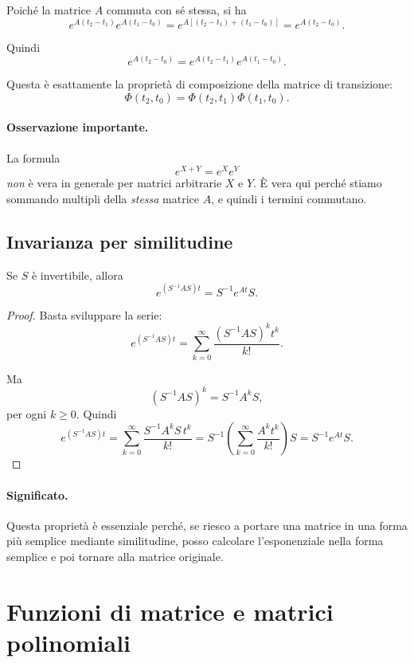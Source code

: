 Poiché la matrice $A$ commuta con sé stessa, si ha
\[
e^{A(t_2-t_1)}e^{A(t_1-t_0)}=e^{A[(t_2-t_1)+(t_1-t_0)]}=e^{A(t_2-t_0)}.
\]

Quindi
\begin{equation}
e^{A(t_2-t_0)}=e^{A(t_2-t_1)}e^{A(t_1-t_0)}.
\label{eq:L5_exp_composition}
\end{equation}

Questa è esattamente la proprietà di composizione della matrice di transizione:
\[
\Phi(t_2,t_0)=\Phi(t_2,t_1)\Phi(t_1,t_0).
\]

\paragraph{Osservazione importante.}
La formula
\[
e^{X+Y}=e^Xe^Y
\]
\emph{non} è vera in generale per matrici arbitrarie $X$ e $Y$. È vera qui perché stiamo sommando multipli della \emph{stessa} matrice $A$, e quindi i termini commutano.

\subsection{Invarianza per similitudine}

Se $S$ è invertibile, allora
\begin{equation}
e^{(S^{-1}AS)t}=S^{-1}e^{At}S.
\label{eq:L5_similarity_exp}
\end{equation}

\begin{proof}
Basta sviluppare la serie:
\[
e^{(S^{-1}AS)t}
=
\sum_{k=0}^{\infty}\frac{(S^{-1}AS)^k t^k}{k!}.
\]

Ma
\[
(S^{-1}AS)^k=S^{-1}A^kS,
\]
per ogni $k\ge 0$. Quindi
\[
e^{(S^{-1}AS)t}
=
\sum_{k=0}^{\infty}\frac{S^{-1}A^kS\,t^k}{k!}
=
S^{-1}\left(\sum_{k=0}^{\infty}\frac{A^k t^k}{k!}\right)S
=
S^{-1}e^{At}S.
\]
\end{proof}

\paragraph{Significato.}
Questa proprietà è essenziale perché, se riesco a portare una matrice in una forma più semplice mediante similitudine, posso calcolare l'esponenziale nella forma semplice e poi tornare alla matrice originale.

\section{Funzioni di matrice e matrici polinomiali}

